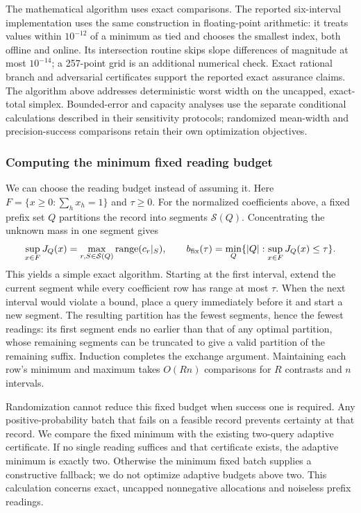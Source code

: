 \documentclass[12pt]{article}
\begin{document}
The mathematical algorithm uses exact comparisons.  The reported
six-interval implementation uses the same construction in floating-point
arithmetic: it treats values within $10^{-12}$ of a minimum as tied and
chooses the smallest index, both offline and online.  Its intersection
routine skips slope differences of magnitude at most $10^{-14}$; a
257-point grid is an additional numerical check.  Exact rational branch
and adversarial certificates support the reported exact assurance claims.
The algorithm above addresses deterministic worst width on the uncapped,
exact-total simplex.  Bounded-error and capacity analyses use the separate
conditional calculations described in their sensitivity protocols;
randomized mean-width and precision-success comparisons retain their own
optimization objectives.
\subsubsection{Computing the minimum fixed reading budget}
\label{sec:minimum-fixed-budget}
We can choose the reading budget instead of assuming it. Here
$F=\{x\geq0:\sum_hx_h=1\}$ and $\tau\geq0$. For the normalized
coefficients above, a fixed prefix set $Q$ partitions the record into segments
$\mathcal S(Q)$. Concentrating the unknown mass in one segment gives
\[
 \sup_{x\in F}J_Q(x)=
 \max_{r,S\in\mathcal S(Q)}\operatorname{range}(c_r|_S),\qquad
 b_{\rm fix}(\tau)=\min_Q\{|Q|:\sup_{x\in F}J_Q(x)\leq\tau\}.
\]
This yields a simple exact algorithm. Starting at the first interval, extend
the current segment while every coefficient row has range at most $\tau$.
When the next interval would violate a bound, place a query immediately
before it and start a new segment. The resulting partition has the fewest
segments, hence the fewest readings: its first segment ends no earlier than
that of any optimal partition, whose remaining segments can be truncated
to give a valid partition of the remaining suffix. Induction completes the
exchange argument. Maintaining each row's minimum and maximum takes
$O(Rn)$ comparisons for $R$ contrasts and $n$ intervals.

Randomization cannot reduce this fixed budget when success one is required.
Any positive-probability batch that fails on a feasible record prevents
certainty at that record. We compare the fixed minimum with the existing
two-query adaptive certificate. If no single reading suffices and that
certificate exists, the adaptive minimum is exactly two. Otherwise the
minimum fixed batch supplies a constructive fallback; we do not optimize
adaptive budgets above two. This calculation concerns exact, uncapped
nonnegative allocations and noiseless prefix readings.
\end{document}
